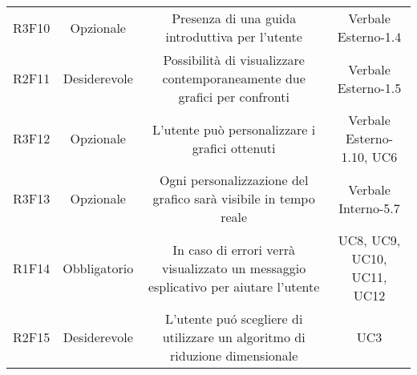 \begin{center}
\begin{longtable}{C{\colA} C{\colB} C{\colC} C{\colA}}
R3F10 & Opzionale & Presenza di una guida introduttiva per l'utente & Verbale Esterno-1.4\\
R2F11 & Desiderevole & Possibilità di visualizzare contemporaneamente due grafici per confronti & Verbale Esterno-1.5\\
R3F12 & Opzionale & L'utente può personalizzare i grafici ottenuti & Verbale Esterno-1.10, UC6 \\
R3F13 & Opzionale & Ogni personalizzazione del grafico sarà visibile in tempo reale & Verbale Interno-5.7 \\
R1F14 & Obbligatorio & In caso di errori verrà visualizzato un messaggio esplicativo per aiutare l'utente & UC8, UC9, UC10, UC11, UC12\\
R2F15 & Desiderevole & L'utente puó scegliere di utilizzare un algoritmo di riduzione dimensionale & UC3 \\ 

\end{longtable}
\end{center}




